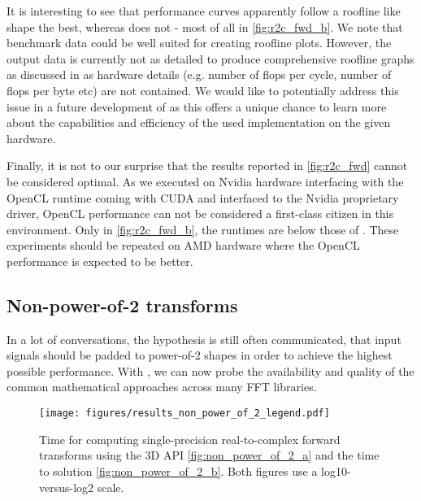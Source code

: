 It is interesting to see that \cufft{} performance curves apparently follow a roofline like shape the best, whereas \fftw{} does not - most of all in \cref{fig:r2c_fwd_b}. We note that \gearshifft{} benchmark data could be well suited for creating roofline plots. However, the output data is currently not as detailed to produce comprehensive roofline graphs as discussed in \cite{ofenbeck2014applying} as hardware details (e.g. number of flops per cycle, number of flops per byte etc) are not contained. We would like to potentially address this issue in a future development of \gearshifft{} as this offers a unique chance to learn more about the capabilities and efficiency of the used implementation on the given hardware. 

Finally, it is not to our surprise that the \clfft{} results reported in \cref{fig:r2c_fwd} cannot be considered optimal. As we executed \clfft{} on Nvidia hardware interfacing with the OpenCL runtime coming with CUDA and interfaced to the Nvidia proprietary driver, OpenCL performance can not be considered a first-class citizen in this environment. Only in \cref{fig:r2c_fwd_b}, the \clfft{} runtimes are below those of \fftw{}. These experiments should be repeated on AMD hardware where the OpenCL performance is expected to be better.
 
\subsection{Non-power-of-2 transforms}
\label{ssec:nonpowerof2}

In a lot of conversations, the hypothesis is still often communicated, that input signals should be padded to power-of-2 shapes in order to achieve the highest possible performance. With \gearshifft{}, we can now probe the availability and quality of the common mathematical approaches across many FFT libraries. 

\begin{figure}[!tbp]
  \centering
  \texttt{[image: figures/results\_non\_power\_of\_2\_legend.pdf]}\vspace{-1em}
  \hfill
  \caption{Time for computing single-precision real-to-complex forward transforms using the 3D API \cref{fig:non_power_of_2_a} and the time to solution \cref{fig:non_power_of_2_b}. Both figures use a log10-versus-log2 scale.}
  \label{fig:non_power_of_2}
\end{figure}


